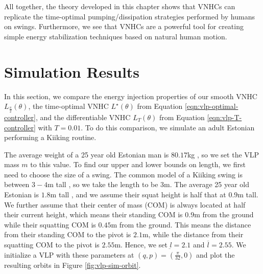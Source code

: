 All together, the theory developed in this chapter shows that VNHCs can
replicate the time-optimal pumping/dissipation strategies performed by humans on
swings.
Furthermore, we see that VNHCs are a powerful tool for creating simple energy
stabilization techniques based on natural human motion.

\section{Simulation Results}
In this section, we compare the energy injection properties of our smooth VNHC
\(L_\frac{\pi}{2}(\theta)\), the time-optimal VNHC \(L^\star(\theta)\) from
Equation \eqref{eqn:vlp-optimal-controller}, and the differentiable
VNHC \(L_T(\theta)\) from Equation \eqref{eqn:vlp-T-controller} with 
\(T = 0.01\).
To do this comparison, we simulate an adult Estonian performing a Kiiking
routine.

The average weight of a 25 year old Estonian man is \(80.17\)kg
\cite{estonian-body-data}, so we set the VLP mass \(m\) to this value.
To find our upper and lower bounds on length, we first need to choose the size
of a swing.
The common model of a Kiiking swing is between \(3-4\)m tall
\cite{kiiking-sale}, so we take the length to be \(3\)m.
The average 25 year old Estonian is \(1.8\)m tall \cite{estonian-body-data}, and
we assume their squat height is half that at \(0.9\)m tall.
We further assume that their center of mass (COM) is always located at half
their current height, which means their standing COM is \(0.9\)m from the ground
while their squatting COM is \(0.45\)m from the ground.
This means the distance from their standing COM to the pivot is \(2.1\)m, while
the distance from their squatting COM to the pivot is \(2.55\)m.
Hence, we set \(\underbar{l} = 2.1\) and \(\overbar{l} = 2.55\).
We initialize a VLP with these parameters at 
\((q,p) = \left(\frac{\pi}{32},0\right)\) and plot the resulting orbits
in Figure \ref{fig:vlp-sim-orbit}.

